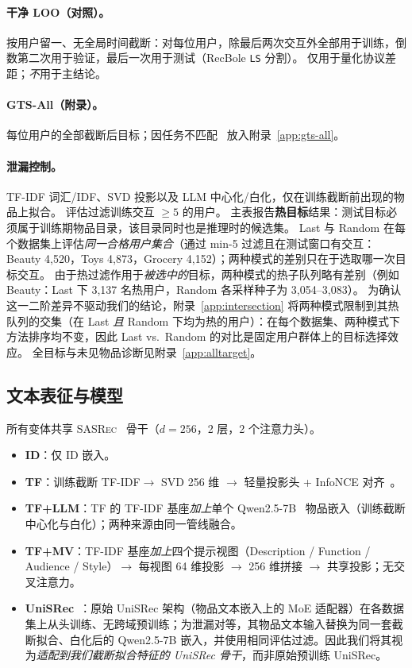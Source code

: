 \documentclass[sigconf,natbib=true,anonymous]{acmart}
\newcommand{\tfidf}{\textsc{TF-IDF}\xspace}
\newcommand{\tfllm}{\textsc{TF+LLM}\xspace}
\newcommand{\tfmv}{\textsc{TF+MV}\xspace}
\newcommand{\base}{\textsc{SASRec}\xspace}
\begin{document}
\paragraph{干净 LOO（对照）。}
按用户留一、无全局时间截断：对每位用户，除最后两次交互外全部用于训练，倒数第二次用于验证，最后一次用于测试（RecBole \texttt{LS} 分割）。
仅用于量化协议差距；\emph{不}用于主结论。

\paragraph{GTS-All（附录）。}
每位用户的全部截断后目标；因任务不匹配~\cite{gusak2025time} 放入附录~\ref{app:gts-all}。

\paragraph{泄漏控制。}
\tfidf 词汇/IDF、SVD 投影以及 LLM 中心化/白化，仅在训练截断前出现的物品上拟合。
评估过滤训练交互 $\ge 5$ 的用户。
主表报告\textbf{热目标}结果：测试目标必须属于训练期物品目录，该目录同时也是推理时的候选集。
Last 与 Random 在每个数据集上评估\emph{同一合格用户集合}（通过 min-5 过滤且在测试窗口有交互：Beauty 4{,}520，Toys 4{,}873，Grocery 4{,}152）；两种模式的差别只在于选取哪一次目标交互。
由于热过滤作用于\emph{被选中的}目标，两种模式的热子队列略有差别（例如 Beauty：Last 下 3{,}137 名热用户，Random 各采样种子为 3{,}054--3{,}083）。
为确认这一二阶差异不驱动我们的结论，附录~\ref{app:intersection} 将两种模式限制到其热队列的交集（在 Last \emph{且} Random 下均为热的用户）：在每个数据集、两种模式下方法排序均不变，因此 Last vs.\ Random 的对比是固定用户群体上的目标选择效应。
全目标与未见物品诊断见附录~\ref{app:alltarget}。

\subsection{文本表征与模型}
\label{sec:models}

所有变体共享 \base~\cite{kang2018sasrec} 骨干（$d{=}256$，2 层，2 个注意力头）。

\begin{itemize}[leftmargin=*,itemsep=1pt]
\item \textbf{ID}：仅 ID 嵌入。
\item \textbf{TF}：训练截断 \tfidf $\to$ SVD 256 维 $\to$ 轻量投影头 + InfoNCE 对齐~\cite{oord2018cpc}。
\item \textbf{\tfllm}：TF 的 \tfidf 基座\emph{加上}单个 Qwen2.5-7B~\cite{qwen2024qwen25} 物品嵌入（训练截断中心化与白化）；两种来源由同一管线融合。
\item \textbf{\tfmv}：\tfidf 基座\emph{加上}四个提示视图（Description / Function / Audience / Style）$\to$ 每视图 64 维投影 $\to$ 256 维拼接 $\to$ 共享投影；无交叉注意力。
\item \textbf{UniSRec}~\cite{hou2022unisrec}：原始 UniSRec 架构（物品文本嵌入上的 MoE 适配器）在各数据集上从头训练、无跨域预训练；为泄漏对等，其物品文本输入替换为同一套截断拟合、白化后的 Qwen2.5-7B 嵌入，并使用相同评估过滤。因此我们将其视为\emph{适配到我们截断拟合特征的 UniSRec 骨干}，而非原始预训练 UniSRec。
\end{itemize}
\end{document}
